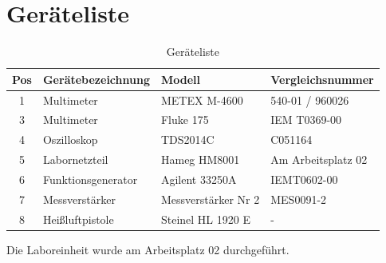 \section{Geräteliste}\label{sec:geraeteliste}

\begin{table}[h]
    \centering
    \caption{Geräteliste}\label{tab:geraeteliste}
    \begin{tabularx}{\columnwidth}{cXXX}
        Pos & \textbf{Gerätebezeichnung} & \textbf{Modell} & \textbf{Vergleichsnummer}\\ \midrule
        1 & Multimeter & METEX M-4600 & 540-01 / 960026\\
        3 & Multimeter & Fluke 175 & IEM T0369-00\\
        4 & Oszilloskop & TDS2014C & C051164\\
        5 & Labornetzteil & Hameg HM8001 & Am Arbeitsplatz 02 \\
        6 & Funktionsgenerator & Agilent 33250A & IEMT0602-00 \\
        7 & Messverstärker & Messverstärker Nr 2 & MES0091-2 \\
        8 & Heißluftpistole & Steinel HL 1920 E & - \\
\end{tabularx} 
\end{table}

Die Laboreinheit wurde am Arbeitsplatz 02 durchgeführt.
